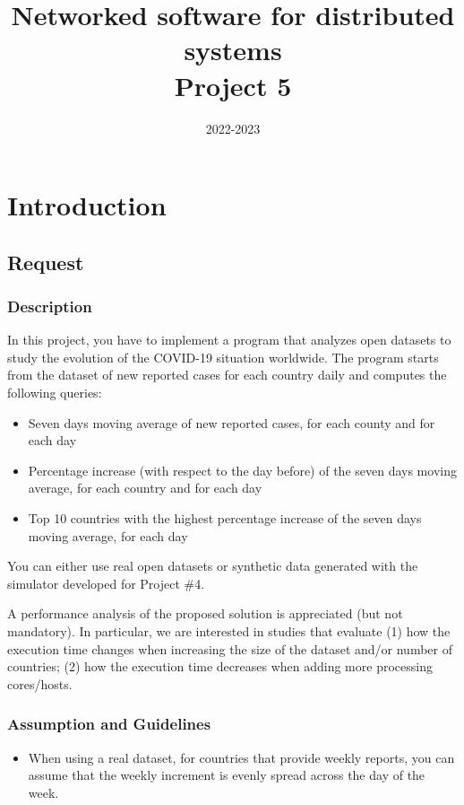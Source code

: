 \documentclass[11pt]{article}
\title{Networked software for distributed systems\\Project 5}
\date{2022-2023}
\begin{document}


\tableofcontents
\cleardoublepage

\section{Introduction}

\subsection{Request}
\subsubsection{Description}
In this project, you have to implement a program that analyzes open datasets to study the evolution of the COVID-19 situation worldwide. The program starts from the dataset of new reported cases for each country daily and computes the following queries:
\begin{itemize}
  \item Seven days moving average of new reported cases, for each county and for each day
  \item Percentage increase (with respect to the day before) of the seven days moving average, for each country and for each day
  \item Top 10 countries with the highest percentage increase of the seven days moving average, for each day
\end{itemize}
You can either use real open datasets or synthetic data generated with the simulator developed for Project \#4.

A performance analysis of the proposed solution is appreciated (but not mandatory). In particular, we are interested in studies that evaluate (1) how the execution time changes when increasing the size of the dataset and/or number of countries; (2) how the execution time decreases when adding more processing cores/hosts. 

\subsubsection{Assumption and Guidelines}
\begin{itemize}
    \item When using a real dataset, for countries that provide weekly reports, you can assume that the weekly increment is evenly spread across the day of the week.
\end{itemize}
\end{document}
